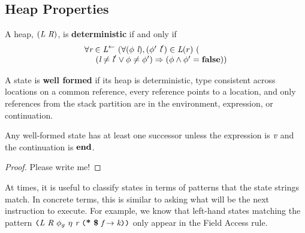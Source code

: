 \subsection{Heap Properties}


\begin{definition}
A heap, $(\emph{L}\ \emph{R})$, is \textbf{deterministic} if and only if 
\[
\begin{array}{l}
\forall \cfgnt{r} \in \cfgnt{L}^\leftarrow\ (\forall (\phi\ \cfgnt{l}),(\phi^\prime\ \cfgnt{l}^\prime) \in \cfgnt{L}(r)\ (\\
\ \ \ \ (\cfgnt{l} \neq \cfgnt{l}^\prime \vee \phi \neq \phi^\prime) \Rightarrow (\phi \wedge \phi^\prime = \cfgt{false}))
\end{array}
\]
\end{definition}

\begin{definition}
A state is \textbf{well formed} if its heap is deterministic, type consistent across locations on a common reference, every reference points to a location, and only references from the stack partition are in the environment, expression, or continuation.
\end{definition}

\begin{lemma}
\label{lem:succ}
Any well-formed state has at least one successor unless the expression is $\emph{v}$ and the continuation is $\textbf{end}$.
\end{lemma}
\begin{proof}
Please write me!
\end{proof}

At times, it is useful to classify states in terms of patterns that the state strings match. In concrete terms, this is similar to asking what will be the next instruction to execute. For example, we know that left-hand states matching the pattern $ \lp \cfgnt{L}\ \cfgnt{R}\ \phi_g\ \eta\ \cfgnt{r}\ \lp \cfgt{*}\ \cfgt{\$}\ \cfgnt{f} \rightarrow \cfgnt{k}\rp \rp$ only appear in the Field Access rule.

